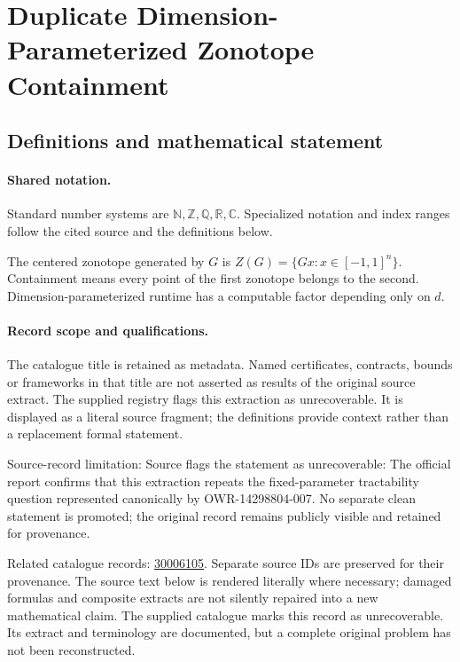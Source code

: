 \documentclass[11pt]{article}
\begin{document}
\section{Duplicate Dimension-Parameterized Zonotope Containment}\label{statement}

\subsection{Definitions and mathematical statement}

\paragraph{Shared notation.}Standard number systems are $\mathbb N,\mathbb Z,\mathbb Q,\mathbb R,\mathbb C$. Specialized notation and index ranges follow the cited source and the definitions below.


The centered zonotope generated by $G$ is $Z(G)=\{Gx:x\in[-1,1]^n\}$. Containment means every point of the first zonotope belongs to the second. Dimension-parameterized runtime has a computable factor depending only on $d$.
\paragraph{Record scope and qualifications.}
The catalogue title is retained as metadata. Named certificates, contracts, bounds or frameworks in that title are not asserted as results of the original source extract.
The supplied registry flags this extraction as unrecoverable. It is displayed as a literal source fragment; the definitions provide context rather than a replacement formal statement.

Source-record limitation: Source flags the statement as unrecoverable: The official report confirms that this extraction repeats the fixed-parameter tractability question represented canonically by OWR-14298804-007. No separate clean statement is promoted; the original record remains publicly visible and retained for provenance.

Related catalogue records: \href{https://mehmetmars7.github.io/Erdosproblems-llm-hunter/problem.html?type=open_problems&id=30006105}{30006105}. Separate source IDs are preserved for their provenance.
The source text below is rendered literally where necessary; damaged formulas and composite extracts are not silently repaired into a new mathematical claim.
The supplied catalogue marks this record as unrecoverable. Its extract and terminology are documented, but a complete original problem has not been reconstructed.
\end{document}
